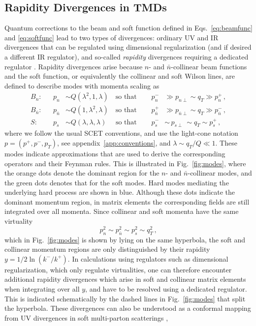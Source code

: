 \documentclass[11pt,a4paper]{article}
\DeclareRobustCommand{\eqs}[2]{Eqs.~\eqref{eq:#1} and \eqref{eq:#2}}
\DeclareRobustCommand{\fig}[1]{Fig.~\ref{fig:#1}}
\DeclareRobustCommand{\app}[1]{appendix~\ref{app:#1}}
\newcommand{\nn}{\nonumber}
\newcommand{\bn}{{\bar{n}}}
\begin{document}
\subsection{Rapidity Divergences in TMDs}
\label{sec:rapidity_divergences}

Quantum corrections to the beam and soft function defined in \eqs{beamfunc}{softfunc}
lead to two types of divergences: ordinary UV and IR divergences that can be regulated
using dimensional regularization (and if desired a different IR regulator),
and so-called \emph{rapidity} divergences requiring a dedicated regulator
\cite{Collins:1981uk,Collins:1992tv,Manohar:2006nz,Collins:2008ht,Becher:2010tm,GarciaEchevarria:2011rb,Chiu:2011qc,Chiu:2012ir}.
Rapidity divergences arise because $n$- and $\bn$-collinear beam functions and the soft function,
or equivalently the collinear and soft Wilson lines, are defined to describe modes with momenta scaling as
\begin{align}
 B_n:& 
 &p_n& \sim Q (\lambda^2, 1, \lambda)
 \quad \text{so that} \quad
 &p_n^-& \gg p_{n \perp} \sim q_T \gg p_n^+
\,,\nn\\
 B_\bn:& 
 &p_\bn& \sim Q (1, \lambda^2, \lambda)
 \quad \text{so that} \quad
 &p_\bn^+& \gg p_{\bn \perp}  \sim q_T \gg p_{\bn}^-
\,,\nn\\
 S:&
 &p_s& \sim Q (\lambda, \lambda, \lambda)
 \quad \text{ so that } \quad
 &p_s^-& \sim\, p_{s \perp}  \,\sim q_T \sim p_s^+
\,,\end{align}
where we follow the usual SCET conventions, and use the light-cone notation $p = (p^+, p^-, p_T)$, see \app{conventions}, and $\lambda \sim q_T / Q\ll 1$.
These modes indicate approximations that are used to derive the corresponding operators and their Feynman rules.
This is illustrated in \fig{modes}, where the orange dots denote the dominant region for the $n$- and $\bn$-collinear modes,
and the green dots denotes that for the soft modes. 
Hard modes mediating the underlying hard process are shown in blue.
Although these dots indicate the dominant momentum region, in matrix elements the corresponding fields are still integrated over all momenta.
Since collinear and soft momenta have the same virtuality
\begin{equation}
 p_n^2 \sim p_\bn^2 \sim p_s^2 \sim q_T^2
\,,\end{equation}
which in \fig{modes} is shown by lying on the same hyperbola,
the soft and collinear momentum regions are only distinguished by their rapidity $y = 1/2 \ln(k^-/k^+)$.
In calculations using regulators such as dimensional regularization, which only regulate virtualities, one 
can therefore encounter additional rapidity divergences which arise in soft and collinear matrix elements when integrating over all $y$, 
and have to be resolved using a dedicated regulator.
This is indicated schematically by the dashed lines in \fig{modes} that split the hyperbola.
These divergences can also be understood as a conformal mapping from UV divergences in soft multi-parton scatterings \cite{Vladimirov:2016dll,Vladimirov:2017ksc},
\end{document}
